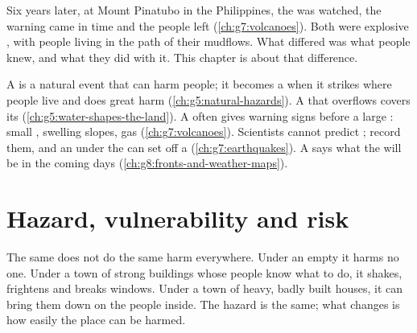 Six years later, at Mount Pinatubo in the Philippines, the  was
watched, the warning came in time and the people left
(\cref{ch:g7:volcanoes}). Both were explosive , with people
living in the path of their mudflows. What differed was what people
knew, and what they did with it. This chapter
is about that difference.

\begin{recall}
A \emph{} is a natural event that can harm people; it
becomes a \emph{} when it strikes where people live and
does great harm (\cref{ch:g5:natural-hazards}). A  that overflows
covers its  (\cref{ch:g5:water-shapes-the-land}). A 
often gives warning signs before a large : small ,
swelling slopes, gas (\cref{ch:g7:volcanoes}). Scientists cannot predict
;  record them, and an  under the 
can set off a  (\cref{ch:g7:earthquakes}). A 
says what the  will be in the coming days
(\cref{ch:g8:fronts-and-weather-maps}).
\end{recall}

\section{Hazard, vulnerability and risk}

The same  does not do the same harm everywhere. Under an empty
 it harms no one. Under a town of strong buildings whose people
know what to do, it shakes, frightens and breaks windows. Under a town of
heavy, badly built houses, it can bring them down on the people inside.
The hazard is the same; what changes is how easily the place can be
harmed.

